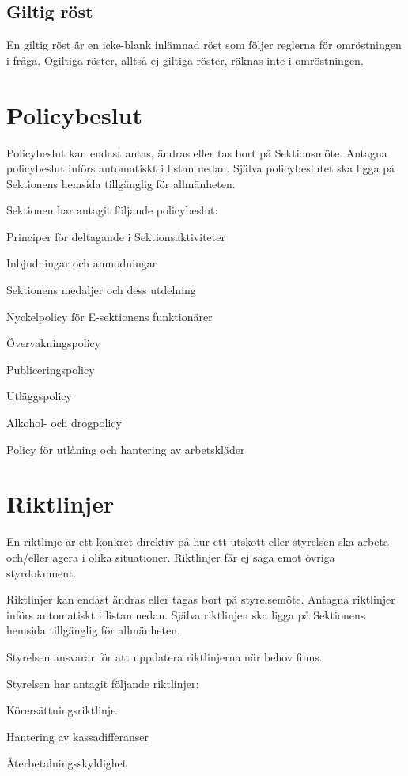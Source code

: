 \documentclass[10pt]{article}
\begin{document}
\subsection{Giltig röst}
En giltig röst är en icke-blank inlämnad röst som följer reglerna för omröstningen i fråga. Ogiltiga röster, alltså ej giltiga röster, räknas inte i omröstningen.
\newpage

\section{Policybeslut}
Policybeslut kan endast antas, ändras eller tas bort på Sektionsmöte. Antagna policybeslut införs automatiskt i listan nedan. Själva policybeslutet ska ligga på Sektionens hemsida tillgänglig för allmänheten.

Sektionen har antagit följande policybeslut:
\begin{dashlist}
    \item Principer för deltagande i Sektionsaktiviteter
    \item Inbjudningar och anmodningar
    \item Sektionens medaljer och dess utdelning
    \item Nyckelpolicy för E-sektionens funktionärer
    \item Övervakningspolicy
    \item Publiceringspolicy
    \item Utläggspolicy
    \item Alkohol- och drogpolicy
    \item Policy för utlåning och hantering av arbetskläder
\end{dashlist}

\section{Riktlinjer}
En riktlinje är ett konkret direktiv på hur ett utskott eller styrelsen ska arbeta och/eller agera i olika situationer. Riktlinjer får ej säga emot övriga styrdokument.

Riktlinjer kan endast ändras eller tagas bort på styrelsemöte. Antagna riktlinjer införs automatiskt i listan nedan. Själva riktlinjen ska ligga på Sektionens hemsida tillgänglig för allmänheten.

Styrelsen ansvarar för att uppdatera riktlinjerna när behov finns.

Styrelsen har antagit följande riktlinjer:

\begin{dashlist}
    \item Körersättningsriktlinje
    \item Hantering av kassadifferanser
    \item Återbetalningsskyldighet
\end{dashlist}
\end{document}
